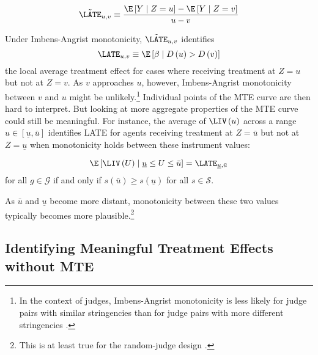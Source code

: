 \[
\tilde{\LATE}_{u,v}\equiv\frac{\E\left[Y\mid Z=u\right]-\E\left[Y\mid Z=v\right]}{u-v}
\]

Under Imbens-Angrist monotonicity, $\tilde{\LATE}_{u,v}$ identifies
\[
\LATE_{u,v}\equiv\E\left[\beta\mid D\left(u\right)>D\left(v\right)\right]
\]
the local average treatment effect for cases where receiving treatment
at $Z=u$ but not at $Z=v$. As $v$ approaches $u$, however, Imbens-Angrist
monotonicity between $v$ and $u$ might be unlikely.\footnote{In the context of judges, Imbens-Angrist monotonicity is less likely
for judge pairs with similar stringencies than for judge pairs with
more different stringencies \citep{sigstad2023monotonicity}. } Individual points of the MTE curve are then hard to interpret. But
looking at more aggregate properties of the MTE curve could still
be meaningful. For instance, the average of $\LIV\left(u\right)$
across a range $u\in\left[\underline{u},\bar{u}\right]$ identifies
LATE for agents receiving treatment at $Z=\bar{u}$ but not at $Z=\underline{u}$
when monotonicity holds between these instrument values:
\begin{prop}
\label{prop:MTE-curve}
\[
\E\left[\LIV\left(U\right)\mid\underline{u}\leq U\leq\bar{u}\right]=\LATE_{\underline{u},\bar{u}}
\]
for all $g\in\mathcal{G}$ if and only if $s\left(\bar{u}\right)\geq s\left(\underline{u}\right)$
for all $s\in\mathcal{S}$.
\end{prop}

As $\bar{u}$ and $\underline{u}$ become more distant, monotonicity
between these two values typically becomes more plausible.\footnote{This is at least true for the random-judge design \citep{sigstad2023monotonicity}.}

\subsection{Identifying Meaningful Treatment Effects without MTE\label{subsec:without-MTE-1}}

